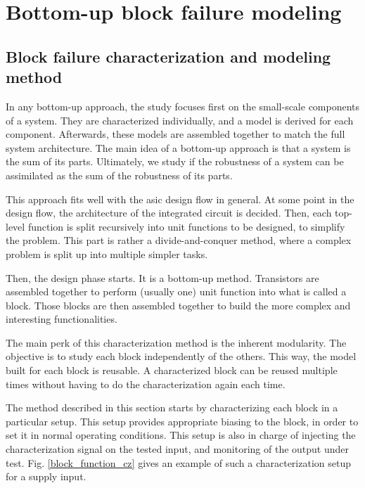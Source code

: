 \section{Bottom-up block failure modeling}
\label{sec:bottom-up-modeling}

\subsection{Block failure characterization and modeling method}
\label{sec:block-failure-cz}

In any bottom-up approach, the study focuses first on the small-scale components of a system.
They are characterized individually, and a model is derived for each component.
Afterwards, these models are assembled together to match the full system architecture.
The main idea of a bottom-up approach is that a system is the sum of its parts.
Ultimately, we study if the robustness of a system can be assimilated as the sum of the robustness of its parts.

This approach fits well with the \gls{asic} design flow in general.
At some point in the design flow, the architecture of the integrated circuit is decided.
Then, each top-level function is split recursively into unit functions to be designed, to simplify the problem.
This part is rather a divide-and-conquer method, where a complex problem is split up into multiple simpler tasks.

Then, the design phase starts. It is a bottom-up method.
Transistors are assembled together to perform (usually one) unit function into what is called a \gls{block}.
Those blocks are then assembled together to build the more complex and interesting functionalities.

The main perk of this characterization method is the inherent modularity.
The objective is to study each block independently of the others.
This way, the model built for each block is reusable.
A characterized block can be reused multiple times without having to do the characterization again each time.

The method described in this section starts by characterizing each block in a particular setup.
This setup provides appropriate biasing to the block, in order to set it in normal operating conditions.
This setup is also in charge of injecting the characterization signal on the tested input, and monitoring of the output under test.
Fig. \ref{block_function_cz} gives an example of such a characterization setup for a supply input.

